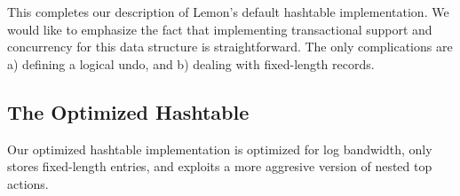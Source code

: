 \documentclass[letterpaper,twocolumn,english]{article}
\newcommand{\yad}{Lemon\xspace}
\newcommand{\eab}[1]{\textcolor{red}{\bf EAB: #1}}
\begin{document}



This completes our description of \yad's default hashtable
implementation.  We would like to emphasize the fact that implementing
transactional support and concurrency for this data structure is
straightforward.  The only complications are a) defining a logical undo, and b) dealing with fixed-length records.




\subsection{The Optimized Hashtable}

Our optimized hashtable implementation is optimized for log bandwidth,
only stores fixed-length entries, and exploits a more aggresive
version of nested top actions.
\end{document}
